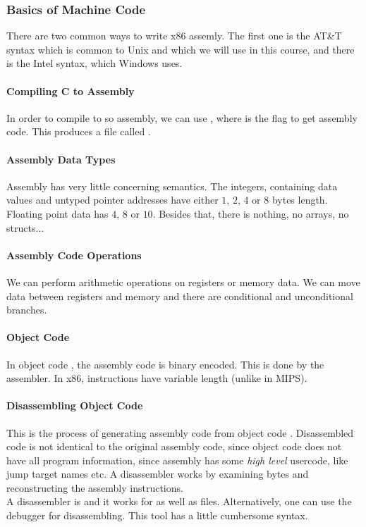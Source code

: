 \subsubsection{Basics of Machine Code}
There are two common ways to write x86 assemly. The first one is the AT\&T syntax which is common to Unix and which we will use in this course, and there is the Intel syntax, which Windows uses.

\paragraph{Compiling C to Assembly}
In order to compile to so assembly, we can use , where  is the flag to get assembly code. This produces a file called .

\paragraph{Assembly Data Types}
Assembly has very little concerning semantics. The integers, containing data values and untyped pointer addresses have either $1$, $2$, $4$ or $8$ bytes length. Floating point data has $4$, $8$ or $10$. Besides that, there is nothing, no arrays, no structs...

\paragraph{Assembly Code Operations}
We can perform arithmetic operations on registers or memory data. We can move data between registers and memory and there are conditional and unconditional branches.

\paragraph{Object Code}
In object code , the assembly code  is binary encoded. This is done by the assembler. In x86, instructions have variable length (unlike in MIPS).

\paragraph{Disassembling Object Code}
This is the process of generating assembly code  from object code . Disassembled code is not identical to the original assembly code, since object code does not have all program information, since assembly has some \textit{high level} usercode, like jump target names etc. A disassembler works by examining bytes and reconstructing the assembly instructions.\\
A disassembler is  and it works for  as well as  files. Alternatively, one can use the  debugger for disassembling. This tool has a little cumbersome syntax.

